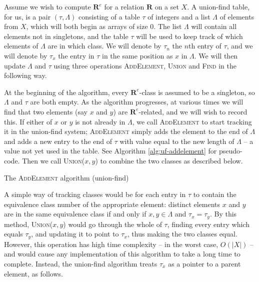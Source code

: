 Assume we wish to compute $\mathbf{R}^e$ for a relation $\mathbf{R}$ on a set
$X$.  A union-find table, for us, is a pair $(\tau, \Lambda)$ consisting of a
table $\tau$ of integers and a list $\Lambda$ of elements from $X$, which will
both begin as arrays of size $0$.  The list $\Lambda$ will contain all elements
not in singletons, and the table $\tau$ will be used to keep track of which
elements of $\Lambda$ are in which class.  We will denote by $\tau_n$ the $n$th
entry of $\tau$, and we will denote by $\tau_x$ the entry in $\tau$ in the same
position as $x$ in $\Lambda$.  We will then update $\Lambda$ and $\tau$ using
three operations \textsc{AddElement}, \textsc{Union} and \textsc{Find} in the
following way.

At the beginning of the algorithm, every $\mathbf{R}^e$-class is assumed to be a
singleton, so $\Lambda$ and $\tau$ are both empty.  As the algorithm progresses,
at various times we will find that two elements (say $x$ and $y$) are
$\mathbf{R}^e$-related, and we will wish to record this.  If either of $x$ or
$y$ is not already in $\Lambda$, we call \textsc{AddElement} to start tracking
it in the union-find system; \textsc{AddElement} simply adds the element to the
end of $\Lambda$ and adds a new entry to the end of $\tau$ with value equal to
the new length of $\Lambda$ -- a value not yet used in the table.  See Algorithm
\ref{alg:uf-addelement} for pseudo-code.  Then we call \textsc{Union($x,y$)} to
combine the two classes as described below.

\begin{algorithm}
\caption{The \textsc{AddElement} algorithm (union-find)}
\label{alg:uf-addelement}
  \begin{algorithmic}
    \EndProcedure
  \end{algorithmic}
\end{algorithm}

A simple way of tracking classes would be for each entry in $\tau$ to contain
the equivalence class number of the appropriate element: distinct elements $x$
and $y$ are in the same equivalence class if and only if $x,y \in \Lambda$ and
$\tau_x = \tau_y$.  By this method, \textsc{Union($x,y$)} would go through the
whole of $\tau$, finding every entry which equals $\tau_y$, and updating it to
point to $\tau_x$, thus making the two classes equal.  However, this operation
has high time complexity -- in the worst case, $O(|X|)$ -- and would cause any
implementation of this algorithm to take a long time to complete.  Instead, the
union-find algorithm treats $\tau_x$ as a pointer to a parent element, as
follows.


